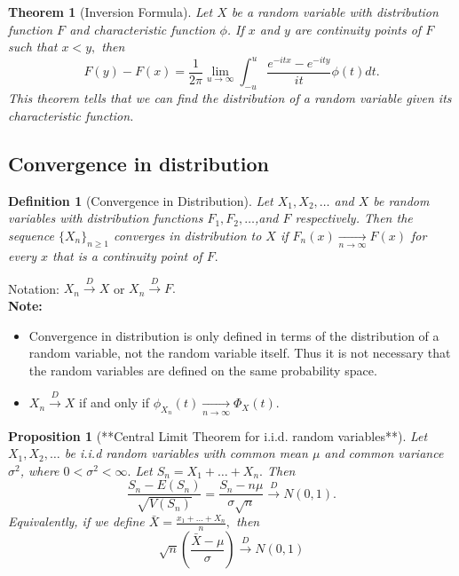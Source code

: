 \documentclass[12pt]{report} \addtolength{\textheight}{2in}
\newtheorem{defn}{Definition}
\newtheorem{prop}{Proposition}
\newtheorem{thm}{Theorem}
\newcommand{\dto}{\overset{D}{\longrightarrow}}
\newcommand{\ntends}{\underset{n\to\infty}{\longrightarrow}}
\begin{document}
\begin{thm}[Inversion Formula]
Let $X$ be a random variable with distribution function $F$ and characteristic function $\phi$. If $x$ and $y$ are continuity points of $F$ such that $x < y,$ then
\begin{displaymath}
F(y)-F(x)=\frac{1}{2\pi} \lim_{u\to\infty} \int_{-u}^{u} \frac{e^{-itx}-e^{-ity}}{it} \phi(t)dt.
\end{displaymath}
This theorem tells that we can find the distribution of a random variable given its characteristic function.
\end{thm}
\subsection*{Convergence in distribution}
\begin{defn}[Convergence in Distribution]
Let $X_1,X_2,\dots$ and $X$ be random variables with distribution functions $F_1,F_2,\dots$,and $F$ respectively. Then the sequence $\{X_n\}_{n\geq 1}$ converges in distribution to $X$ if $F_n(x)\underset{n\to\infty}{\longrightarrow}F(x)$ for every $x$ that is a continuity point of $F.$
\end{defn}
Notation: $X_n \dto X$ or $X_n\dto F.$\\
\textbf{Note:} 
\begin{itemize}
\item Convergence in distribution is only defined in terms of the distribution of a random variable, not the random variable itself. Thus it is not necessary that the random variables are defined on the same probability space.
\item $X_n \dto X$ if and only if $\phi_{X_n}(t) \ntends \Phi_X(t).$
\end{itemize}
\begin{prop}[**Central Limit Theorem for i.i.d. random variables**]

Let $X_1,X_2,\dots$ be i.i.d random variables with common mean $\mu$ and common variance $\sigma^2$, where $0 < \sigma^2 < \infty.$ Let $S_n = X_1 +\dots + X_n.$ Then
\begin{displaymath}
\frac{S_n-E(S_n)}{\sqrt{V(S_n)}}=\frac{S_n-n\mu}{\sigma\sqrt{n}} \dto N(0,1).
\end{displaymath}
Equivalently, if we define $\bar{X}=\frac{x_1+\dots+X_n}{n},$ then
\begin{displaymath}
\sqrt{n}(\frac{\bar{X}-\mu}{\sigma} )\dto N(0,1)
\end{displaymath}
\end{prop}
\end{document}
